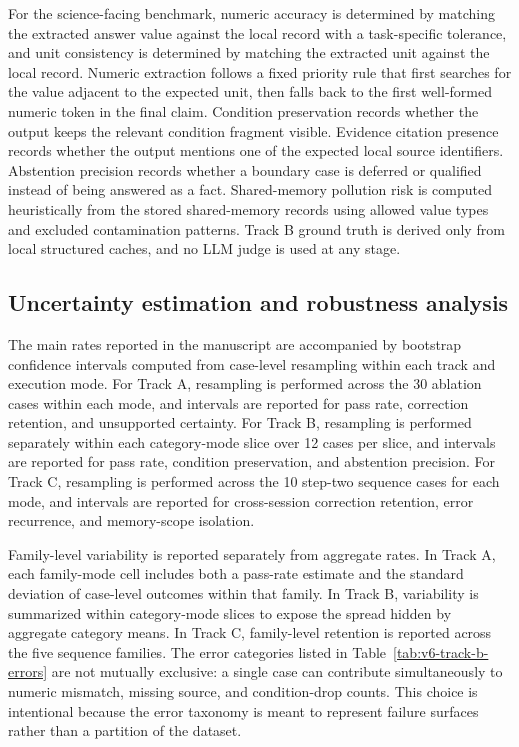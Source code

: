 \documentclass[12pt]{article}
\begin{document}
For the science-facing benchmark, numeric accuracy is determined by matching the extracted answer value against the local record with a task-specific tolerance, and unit consistency is determined by matching the extracted unit against the local record. Numeric extraction follows a fixed priority rule that first searches for the value adjacent to the expected unit, then falls back to the first well-formed numeric token in the final claim. Condition preservation records whether the output keeps the relevant condition fragment visible. Evidence citation presence records whether the output mentions one of the expected local source identifiers. Abstention precision records whether a boundary case is deferred or qualified instead of being answered as a fact. Shared-memory pollution risk is computed heuristically from the stored shared-memory records using allowed value types and excluded contamination patterns. Track B ground truth is derived only from local structured caches, and no LLM judge is used at any stage.

\subsection{Uncertainty estimation and robustness analysis}

The main rates reported in the manuscript are accompanied by bootstrap confidence intervals computed from case-level resampling within each track and execution mode. For Track A, resampling is performed across the 30 ablation cases within each mode, and intervals are reported for pass rate, correction retention, and unsupported certainty. For Track B, resampling is performed separately within each category-mode slice over 12 cases per slice, and intervals are reported for pass rate, condition preservation, and abstention precision. For Track C, resampling is performed across the 10 step-two sequence cases for each mode, and intervals are reported for cross-session correction retention, error recurrence, and memory-scope isolation.

Family-level variability is reported separately from aggregate rates. In Track A, each family-mode cell includes both a pass-rate estimate and the standard deviation of case-level outcomes within that family. In Track B, variability is summarized within category-mode slices to expose the spread hidden by aggregate category means. In Track C, family-level retention is reported across the five sequence families. The error categories listed in Table~\ref{tab:v6-track-b-errors} are not mutually exclusive: a single case can contribute simultaneously to numeric mismatch, missing source, and condition-drop counts. This choice is intentional because the error taxonomy is meant to represent failure surfaces rather than a partition of the dataset.
\end{document}
